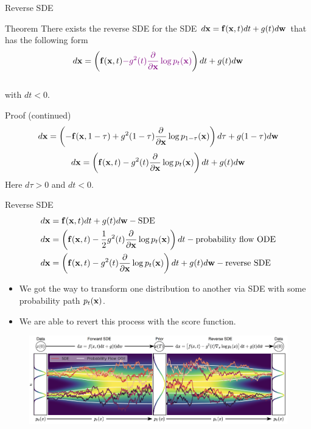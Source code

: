 \begin{frame}{Reverse SDE}
	\begin{block}{Theorem}
		There exists the reverse SDE for the SDE $d\mathbf{x} = \mathbf{f}(\mathbf{x}, t) dt + g(t) d \mathbf{w}$ that has the following form
		\vspace{-0.3cm}
		\[
			d\mathbf{x} = \left(\mathbf{f}(\mathbf{x}, t) {\color{violet}- g^2(t) \frac{\partial}{\partial \mathbf{x}}\log p_t(\mathbf{x})}\right) dt + g(t) d \mathbf{w}
		\]
		\vspace{-0.5cm} \\
		with $dt < 0$.
	\end{block}
	\begin{block}{Proof (continued)}
		\vspace{-0.7cm}
		\[
			d\mathbf{x} = \left(- \mathbf{f}(\mathbf{x}, 1 - \tau) + g^2(1 - \tau) \frac{\partial}{\partial \mathbf{x}} \log p_{1 - \tau}(\mathbf{x}) \right) d \tau + g(1 - \tau) d \mathbf{w}
		\]
		\[
			d\mathbf{x} = \left(\mathbf{f}(\mathbf{x}, t) - g^2(t) \frac{\partial}{\partial \mathbf{x}}\log p_t(\mathbf{x})\right) dt + g(t) d \mathbf{w}
		\]
		Here $d\tau > 0$ and $dt < 0$.
	\end{block}
\end{frame}
\begin{frame}{Reverse SDE}
	\vspace{-0.5cm}
	\begin{align*}
		d\mathbf{x} &= \mathbf{f}(\mathbf{x}, t) dt + g(t) d \mathbf{w} - \text{SDE} \\
		d\mathbf{x} &= \left(\mathbf{f}(\mathbf{x}, t) -\frac{1}{2} g^2(t) \frac{\partial}{\partial \mathbf{x}} \log p_t(\mathbf{x}) \right) dt - \text{probability flow ODE} \\
		d\mathbf{x} &= \left(\mathbf{f}(\mathbf{x}, t) - g^2(t) \frac{\partial}{\partial \mathbf{x}}\log p_t(\mathbf{x})\right) dt + g(t) d \mathbf{w} - \text{reverse SDE}
	\end{align*}
	\vspace{-0.5cm}
	\begin{itemize}
		\item We got the way to transform one distribution to another via SDE with some probability path $p_t(\mathbf{x})$.
		\item We are able to revert this process with the score function.
	\end{itemize}
	\vspace{-0.3cm}
	\begin{figure}
		\includegraphics[width=0.9\linewidth]{figs/sde}
	\end{figure}
\end{frame}
